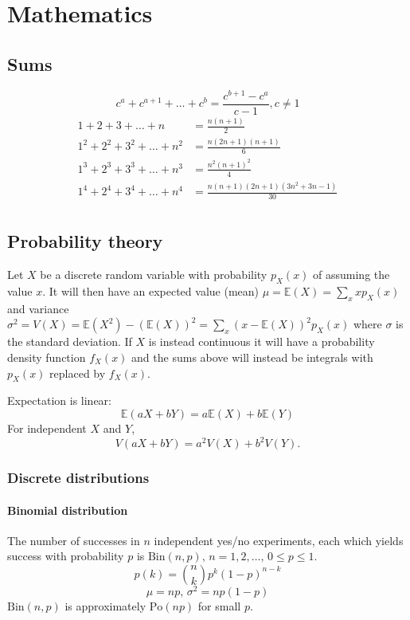 
\chapter{Mathematics}

\section{Sums}
\[ c^a + c^{a+1} + \dots + c^{b} = \frac{c^{b+1} - c^a}{c-1}, c \neq 1 \]
\begin{align*}
	1 + 2 + 3 + \dots + n &= \frac{n(n+1)}{2} \\
	1^2 + 2^2 + 3^2 + \dots + n^2 &= \frac{n(2n+1)(n+1)}{6} \\
	1^3 + 2^3 + 3^3 + \dots + n^3 &= \frac{n^2(n+1)^2}{4} \\
	1^4 + 2^4 + 3^4 + \dots + n^4 &= \frac{n(n+1)(2n+1)(3n^2 + 3n - 1)}{30} \\
\end{align*}

\section{Probability theory}
Let $X$ be a discrete random variable with probability $p_X(x)$ of assuming the value $x$. It will then have an expected value (mean) $\mu=\mathbb{E}(X)=\sum_xxp_X(x)$ and variance $\sigma^2=V(X)=\mathbb{E}(X^2)-(\mathbb{E}(X))^2=\sum_x(x-\mathbb{E}(X))^2p_X(x)$ where $\sigma$ is the standard deviation. If $X$ is instead continuous it will have a probability density function $f_X(x)$ and the sums above will instead be integrals with $p_X(x)$ replaced by $f_X(x)$.

Expectation is linear:
\[\mathbb{E}(aX+bY) = a\mathbb{E}(X)+b\mathbb{E}(Y)\]
For independent $X$ and $Y$, \[V(aX+bY) = a^2V(X)+b^2V(Y).\]

\subsection{Discrete distributions}

\subsubsection{Binomial distribution}
The number of successes in $n$ independent yes/no experiments, each which yields success with probability $p$ is $\textrm{Bin}(n,p),\,n=1,2,\dots,\, 0\leq p\leq1$.
\[p(k)=\binom{n}{k}p^k(1-p)^{n-k}\]
\[\mu = np,\,\sigma^2=np(1-p)\]
$\textrm{Bin}(n,p)$ is approximately $\textrm{Po}(np)$ for small $p$.

